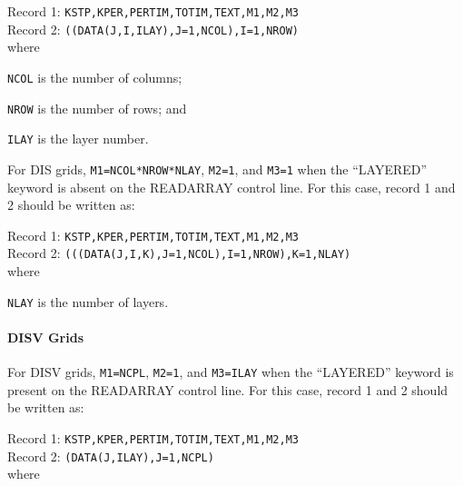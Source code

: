 \vspace{5mm}
\noindent Record 1: \texttt{KSTP,KPER,PERTIM,TOTIM,TEXT,M1,M2,M3} \\
\noindent Record 2: \texttt{((DATA(J,I,ILAY),J=1,NCOL),I=1,NROW)} \\

\vspace{5mm}
\noindent where

\begin{description} \itemsep0pt \parskip0pt 
\item \texttt{NCOL} is the number of columns;
\item \texttt{NROW} is the number of rows; and
\item \texttt{ILAY} is the layer number.
\end{description}

\noindent For DIS grids, \texttt{M1=NCOL*NROW*NLAY}, \texttt{M2=1}, and \texttt{M3=1} when the ``LAYERED'' keyword is absent on the READARRAY control line. For this case, record 1 and 2 should be written as:

\vspace{5mm}
\noindent Record 1: \texttt{KSTP,KPER,PERTIM,TOTIM,TEXT,M1,M2,M3} \\
\noindent Record 2: \texttt{(((DATA(J,I,K),J=1,NCOL),I=1,NROW),K=1,NLAY)} \\

\vspace{5mm}
\noindent where

\begin{description} \itemsep0pt \parskip0pt 
\item \texttt{NLAY} is the number of layers.
\end{description}

\paragraph{DISV Grids}
For DISV grids, \texttt{M1=NCPL}, \texttt{M2=1}, and \texttt{M3=ILAY} when the ``LAYERED'' keyword is present on the READARRAY control line. For this case, record 1 and 2 should be written as:

\vspace{5mm}
\noindent Record 1: \texttt{KSTP,KPER,PERTIM,TOTIM,TEXT,M1,M2,M3} \\
\noindent Record 2: \texttt{(DATA(J,ILAY),J=1,NCPL)} \\

\vspace{5mm}
\noindent where

